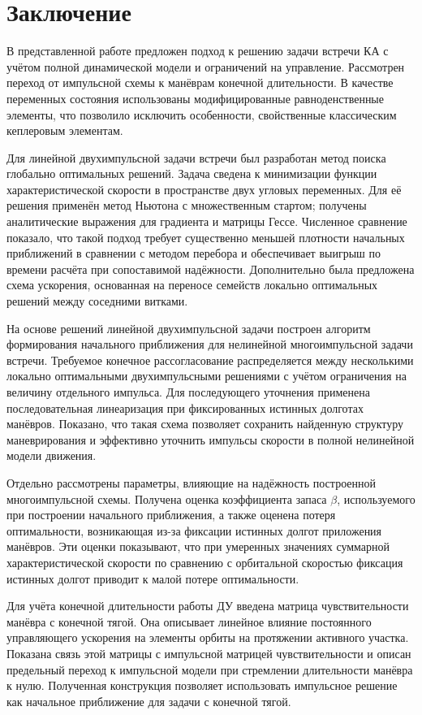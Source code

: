 \section{Заключение}

В представленной работе предложен подход к решению задачи встречи КА с учётом полной динамической модели и ограничений на управление. Рассмотрен переход от импульсной схемы к манёврам конечной длительности. В качестве переменных состояния использованы модифицированные равноденственные элементы, что позволило исключить особенности, свойственные классическим кеплеровым элементам.

Для линейной двухимпульсной задачи встречи был разработан метод поиска глобально оптимальных решений. Задача сведена к минимизации функции характеристической скорости в пространстве двух угловых переменных. Для её решения применён метод Ньютона с множественным стартом; получены аналитические выражения для градиента и матрицы Гессе. Численное сравнение показало, что такой подход требует существенно меньшей плотности начальных приближений в сравнении с методом перебора и обеспечивает выигрыш по времени расчёта при сопоставимой надёжности. Дополнительно была предложена схема ускорения, основанная на переносе семейств локально оптимальных решений между соседними витками.

На основе решений линейной двухимпульсной задачи построен алгоритм формирования начального приближения для нелинейной многоимпульсной задачи встречи. Требуемое конечное рассогласование распределяется между несколькими локально оптимальными двухимпульсными решениями с учётом ограничения на величину отдельного импульса. Для последующего уточнения применена последовательная линеаризация при фиксированных истинных долготах манёвров. Показано, что такая схема позволяет сохранить найденную структуру маневрирования и эффективно уточнить импульсы скорости в полной нелинейной модели движения.

Отдельно рассмотрены параметры, влияющие на надёжность построенной многоимпульсной схемы. Получена оценка коэффициента запаса $\beta$, используемого при построении начального приближения, а также оценена потеря оптимальности, возникающая из-за фиксации истинных долгот приложения манёвров. Эти оценки показывают, что при умеренных значениях суммарной характеристической скорости по сравнению с орбитальной скоростью фиксация истинных долгот приводит к малой потере оптимальности.

Для учёта конечной длительности работы ДУ введена матрица чувствительности манёвра с конечной тягой. Она описывает линейное влияние постоянного управляющего ускорения на элементы орбиты на протяжении активного участка. Показана связь этой матрицы с импульсной матрицей чувствительности и описан предельный переход к импульсной модели при стремлении длительности манёвра к нулю. Полученная конструкция позволяет использовать импульсное решение как начальное приближение для задачи с конечной тягой.

